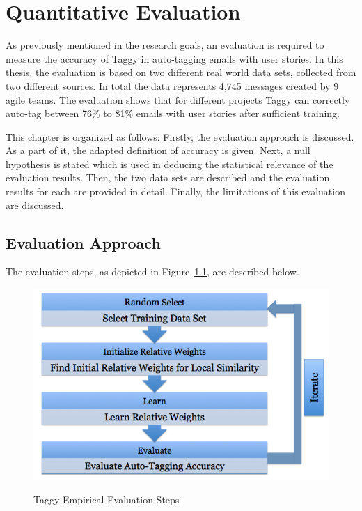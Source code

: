 \fancyhead[RO,LE]{\thepage}
\fancyfoot{} 
\chapter{Quantitative Evaluation}
\label{ch:evaluation}
As previously mentioned in the research goals, an evaluation is required to measure the accuracy of Taggy in auto-tagging emails with user stories. In this thesis, the evaluation is based on two different real world data sets, collected from two different sources. In total the data represents 4,745 messages created by 9 agile teams. The evaluation shows that for different projects Taggy can correctly auto-tag between 76\% to 81\% emails with user stories after sufficient training.

This chapter is organized as follows: Firstly, the evaluation approach is discussed. As a part of it, the adapted definition of accuracy is given. Next, a null hypothesis is stated which is used in deducing the statistical relevance of the evaluation results. Then, the two data sets are described and the evaluation results for each are provided in detail. Finally, the limitations of this evaluation are discussed.

\section{Evaluation Approach}
The evaluation steps, as depicted in Figure~\ref{fig:evaluation}, are described below.

\begin{figure}[h!]
	\centering
	\includegraphics[width=\textwidth]{Evaluation.png}
	\label{fig:evaluation}
  \caption{Taggy Empirical Evaluation Steps}
\end{figure}


